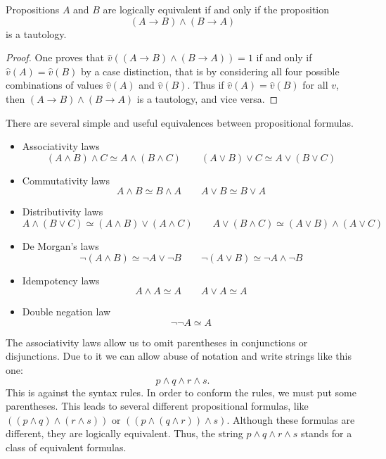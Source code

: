\begin{page}
\setcounter{section}{1}
\setcounter{subsection}{3}
\setcounter{dfn}{10}
\label{portion:380}

\begin{thm}
Propositions $A$ and $B$ are logically equivalent if and only if the proposition
\[
(A \to B) \wedge (B \to A)
\]
is a tautology.
\end{thm}

\end{page}

\begin{page}
\setcounter{section}{1}
\setcounter{subsection}{4}
\setcounter{dfn}{10}
\label{portion:381}

\begin{proof}
One proves that $\hat{v}((A \to B) \wedge (B \to A)) = 1$ if and only if $\hat{v}(A) = \hat{v}(B)$ by a case distinction,
that is by considering all four possible combinations of values $\hat{v}(A)$ and $\hat{v}(B)$.
Thus if $\hat{v}(A) = \hat{v}(B)$ for all $v$, then $(A \to B) \wedge (B \to A)$ is a tautology, and vice versa.
\end{proof}


There are several simple and useful equivalences between propositional formulas.
\begin{itemize}
\item
Associativity laws
\[
(A \wedge B) \wedge C \simeq A \wedge (B \wedge C) \qquad (A \vee B) \vee C \simeq A \vee (B \vee C)
\]
\item
Commutativity laws
\[
A \wedge B \simeq B \wedge A \qquad A \vee B \simeq B \vee A
\]
\item
Distributivity laws
\[
A \wedge (B \vee C) \simeq (A \wedge B) \vee (A \wedge C) \qquad A \vee (B \wedge C) \simeq (A \vee B) \wedge (A \vee C)
\]
\item
De Morgan's laws
\[
\neg(A \wedge B) \simeq \neg A \vee \neg B \qquad \neg(A \vee B) \simeq \neg A \wedge \neg B
\]
\item
Idempotency laws
\[
A \wedge A \simeq A \qquad A \vee A \simeq A
\]
\item
Double negation law
\[
\neg\neg A \simeq A
\]
\end{itemize}

The associativity laws allow us to omit parentheses in conjunctions or disjunctions.
Due to it we can allow abuse of notation and write strings like this one:
\[
p \wedge q \wedge r \wedge s.
\]
This is against the syntax rules.
In order to conform the rules, we must put some parentheses.
This leads to several different propositional formulas, like $((p \wedge q) \wedge (r \wedge s))$ or $((p \wedge (q \wedge r)) \wedge s)$.
Although these formulas are different, they are logically equivalent.
Thus, the string $p \wedge q \wedge r \wedge s$ stands for a class of equivalent formulas.


\end{page}
